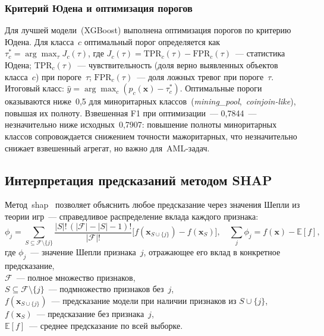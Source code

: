 \subsubsection{Критерий Юдена и оптимизация порогов}

Для лучшей модели~(XGBoost) выполнена оптимизация порогов по критерию Юдена. Для класса~$c$ оптимальный порог определяется как $\tau_c^* = \arg\max_{\tau} J_c(\tau)$, где $J_c(\tau) = \text{TPR}_c(\tau) - \text{FPR}_c(\tau)$~--- статистика Юдена; $\text{TPR}_c(\tau)$~--- чувствительность (доля верно выявленных объектов класса~$c$) при пороге~$\tau$; $\text{FPR}_c(\tau)$~--- доля ложных тревог при пороге~$\tau$.
Итоговый класс: $\hat{y} = \arg\max_c (p_c(\mathbf{x}) - \tau_c^*)$. Оптимальные пороги оказываются ниже~0,5 для миноритарных классов~(\textit{mining\_pool},~\textit{coinjoin-like}), повышая их полноту. Взвешенная F1 при оптимизации~--- 0,7844~--- незначительно ниже исходных~0,7907: повышение полноты миноритарных классов сопровождается снижением точности мажоритарных, что незначительно снижает взвешенный агрегат, но важно для~AML-задач.

\subsection{Интерпретация предсказаний методом SHAP}

Метод~\acrshort{shap}~\cite{shap_paper} позволяет объяснить любое предсказание через значения Шепли из теории игр~--- справедливое распределение вклада каждого признака:
\begin{equation}\label{eq:shap}
    \phi_j = \sum_{S \subseteq \mathcal{F} \setminus \{j\}} \frac{|S|!\,(|\mathcal{F}|-|S|-1)!}{|\mathcal{F}|!}
    \bigl[f(\mathbf{x}_{S \cup \{j\}}) - f(\mathbf{x}_S)\bigr], \quad \sum_j \phi_j = f(\mathbf{x}) - \mathbb{E}[f],
\end{equation}
где $\phi_j$~--- значение Шепли признака~$j$, отражающее его вклад в конкретное предсказание, \\ $\mathcal{F}$~--- полное множество признаков, \\ $S \subseteq \mathcal{F} \setminus \{j\}$~--- подмножество признаков без~$j$, \\ $f(\mathbf{x}_{S \cup \{j\}})$~--- предсказание модели при наличии признаков из $S \cup \{j\}$, \\ $f(\mathbf{x}_S)$~--- предсказание без признака~$j$, \\ $\mathbb{E}[f]$~--- среднее предсказание по всей выборке.


